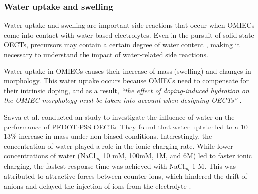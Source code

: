 

\subsubsection{Water uptake and swelling}

Water uptake and swelling are important side reactions that occur when OMIECs come into contact with water-based electrolytes. Even in the pursuit of solid-state OECTs, precursors may contain a certain degree of water content  \cite{weissbachPhotopatternableSolidElectrolyte2022}\cite{nguyen-dangBiomaterialBasedSolidElectrolyteOrganic2021}, making it necessary to understand the impact of water-related side reactions. %

Water uptake in OMIECs causes their increase of mass (swelling) and changes in morphology. This water uptake occurs because OMIECs need to compensate for their intrinsic doping, and as a result, \textit{``the effect of doping-induced hydration on the OMIEC morphology must be taken into account when designing OECTs''} \cite{savvaBalancingIonicElectronic2020}.

Savva et al. conducted an study to investigate the influence of water on the performance of PEDOT:PSS OECTs. They found that water uptake %
led to a 10-13\% increase in mass under non-biased conditions. Interestingly, the concentration of water played a role in the ionic charging rate. While lower concentrations of water (NaCl$_{aq}$ 10 mM, 100mM, 1M, and 6M) led to faster ionic charging, %
the fastest %
response time was achieved with NaCl$_{aq}$ 1 M. This was attributed to attractive forces between counter ions, which %
hindered the drift of anions and delayed the injection of ions from the electrolyte %
\cite{savvaInfluenceWaterPerformance2019}.

